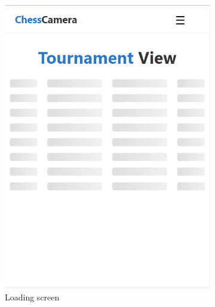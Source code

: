 \begin{figure}[h!]
    \centering
    \begin{subfigure}[h!]{0.4\linewidth}
        \centering
        \includegraphics[width=\linewidth]{figures/results/frontend/tournament-view/loading-mobile.png}
        \caption{Loading screen}
        \label{fig:small-tournament-view-loading}
    \end{subfigure}
    \hfill
    \begin{subfigure}[h!]{0.4\linewidth}
        \centering

\end{subfigure}
\end{figure}
